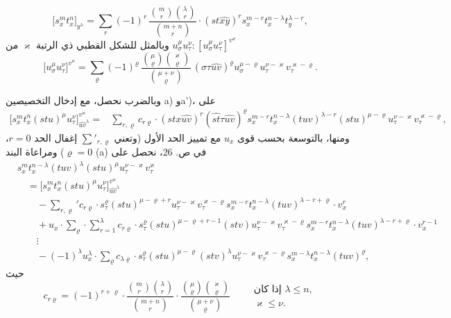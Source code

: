 \documentclass[11pt]{article}
\begin{document}
\[
\bigl[s_x^m t_x^n\bigr]_{y^\lambda}
=\sum_r (-1)^r\,
\frac{\binom{m}{r}\binom{\lambda}{r}}{\binom{m+n}{r}}\cdot
(st\widehat{xy})^r s_x^{m-r}t_x^{n-\lambda}t_y^{\lambda-r},
\]
وبالمثل للشكل القطبي ذي الرتبة $\varkappa$ من $u_\sigma^\mu u_\tau^\nu:[u_\sigma^\mu u_\tau^\nu]^{v^\varkappa}$
\[
\bigl[u_\sigma^\mu u_\tau^\nu\bigr]^{v^\varkappa}
=\sum_\varrho (-1)^\varrho\,
\frac{\binom{\mu}{\varrho}\binom{\varkappa}{\varrho}}{\binom{\mu+\nu}{\varrho}}\,
(\sigma\tau\widehat{uv})^\varrho u_\sigma^{\mu-\varrho}u_\tau^{\nu-\varkappa}v_\tau^{\varkappa-\varrho}.
\]

وبالضرب نحصل، مع إدخال التخصيصين a) وa')، على
\[
\begin{aligned}
\bigl[s_x^m t_x^n(stu)^\mu u_\tau^\nu\bigr]_{\widehat{uv}^{\lambda}}^{v^\varkappa}
={}&
\sum_{r,\varrho}c_{r\varrho}\cdot
(stx\widehat{uv})^r(\widehat{st}\tau\widehat{uv})^\varrho
s_x^{m-r}t_x^{n-\lambda}(tuv)^{\lambda-r}(stu)^{\mu-\varrho}
u_\tau^{\nu-\varkappa}v_\tau^{\varkappa-\varrho},
\end{aligned}
\]
ومنها، بالتوسعة بحسب قوى $u_x$ مع تمييز الحد الأول (وتعني $\sum'_{r,\varrho}$ إغفال الحد $r=0$، $\varrho=0$) ومراعاة البند (a) في ص. 26، نحصل على
\[
\tag{II}
\begin{aligned}
&s_x^m t_x^{n-\lambda}(tuv)^\lambda(stu)^\mu u_\tau^{\nu-\varkappa}v_\tau^\varkappa\\
&\quad =
\bigl[s_x^m t_x^n(stu)^\mu u_\tau^\nu\bigr]_{\widehat{uv}^{\lambda}}^{v^\varkappa}\\
&\qquad
-\sum_{r,\varrho}' c_{r\varrho}\cdot s_\tau^\varrho(stu)^{\mu-\varrho+r}
u_\tau^{\nu-\varkappa}v_\tau^{\varkappa-\varrho}
s_x^{m-r}t_x^{n-\lambda}(tuv)^{\lambda-r+\varrho}\cdot v_x^r\\
&\qquad
+u_x\cdot\sum_{\varrho}\cdot\sum_{r=1}^{\lambda} c_{r\varrho}\cdot
s_\tau^\varrho(stu)^{\mu-\varrho+r-1}(stv)
u_\tau^{\nu-\varkappa}v_\tau^{\varkappa-\varrho}
s_x^{m-r}t_x^{n-\lambda}(tuv)^{\lambda-r+\varrho}\cdot v_x^{r-1}\\
&\qquad
\vdots\\
&\qquad
-(-1)^\lambda u_x^\lambda\cdot\sum_\varrho c_{\lambda\varrho}\cdot
s_\tau^\varrho(stu)^{\mu-\varrho}(stv)^\lambda
u_\tau^{\nu-\varkappa}v_\tau^{\varkappa-\varrho}
s_x^{m-\lambda}t_x^{n-\lambda}(tuv)^\varrho,
\end{aligned}
\]
حيث
\[
c_{r\varrho}=(-1)^{r+\varrho}\cdot
\frac{\binom{m}{r}\binom{\lambda}{r}}{\binom{m+n}{r}}\cdot
\frac{\binom{\mu}{\varrho}\binom{\varkappa}{\varrho}}{\binom{\mu+\nu}{\varrho}}
\qquad
\begin{array}{l}
\text{إذا كان }\lambda\le n,\\
\varkappa\le\nu.
\end{array}
\]
\end{document}
